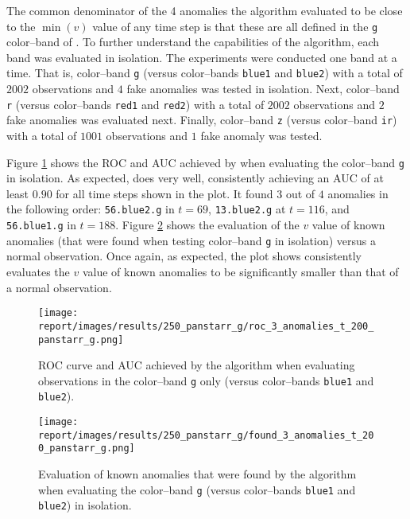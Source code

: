 The common denominator of the 4 anomalies the \mlblink algorithm evaluated to be close to the $\min(v)$ value of any time step is that these are all defined in the \texttt{g} color--band of \panstarrs. To further understand the capabilities of the \mlblink algorithm, each \panstarrs band was evaluated in isolation. The experiments were conducted one \panstarrs band at a time. That is, \panstarrs color--band \texttt{g} (versus \usno color--bands \texttt{blue1} and \texttt{blue2}) with a total of $2002$ observations and $4$ fake anomalies was tested in isolation. Next, \panstarrs color--band \texttt{r} (versus \usno color--bands \texttt{red1} and \texttt{red2}) with a total of $2002$ observations and $2$ fake anomalies was evaluated next. Finally, \panstarrs color--band \texttt{z} (versus \usno color--band \texttt{ir}) with a total of $1001$ observations and $1$ fake anomaly was tested. \newline


Figure \ref{fig:evaluation:roc:panstarrs:g} shows the ROC and AUC achieved by \mlblink when evaluating the \panstarrs color--band \texttt{g} in isolation. As expected, \mlblink does very well, consistently achieving an AUC of at least $0.90$ for all time steps shown in the plot. It found $3$ out of $4$ anomalies in the following order: \texttt{56.blue2.g} in $t = 69$, \texttt{13.blue2.g} at $t = 116$, and \texttt{56.blue1.g} in $t = 188$. Figure \ref{fig:evaluation:found:panstarrs:g} shows the evaluation of the $v$ value of known anomalies (that were found when testing \panstarrs color--band \texttt{g} in isolation) versus a normal observation. Once again, as expected, the plot shows \mlblink consistently evaluates the $v$ value of known anomalies to be significantly smaller than that of a normal observation.

\begin{figure}[H]
  \centering
  \texttt{[image: report/images/results/250\_panstarr\_g/roc\_3\_anomalies\_t\_200\_panstarr\_g.png]}
  \caption{ROC curve and AUC achieved by the \mlblink algorithm when evaluating observations in the \panstarrs color--band \texttt{g} only (versus \usno color--bands \texttt{blue1} and \texttt{blue2}).}
  \label{fig:evaluation:roc:panstarrs:g}
\end{figure}

\begin{figure}[H]
  \centering
  \texttt{[image: report/images/results/250\_panstarr\_g/found\_3\_anomalies\_t\_200\_panstarr\_g.png]}
  \caption{Evaluation of known anomalies that were found by the \mlblink algorithm when evaluating the \panstarrs color--band \texttt{g} (versus \usno color--bands \texttt{blue1} and \texttt{blue2}) in isolation.}
  \label{fig:evaluation:found:panstarrs:g}
\end{figure}

